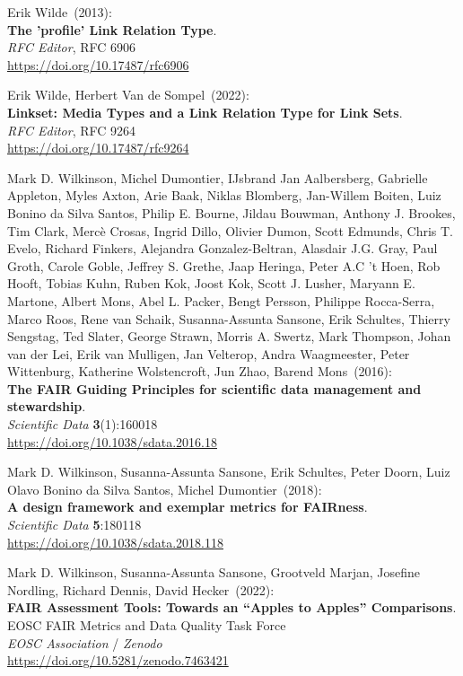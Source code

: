 \begin{thebibliography}{9}
Erik Wilde~(2013): \\
\textbf{The 'profile' Link Relation Type}.\\
\emph{RFC Editor}, RFC 6906\\
\url{https://doi.org/10.17487/rfc6906}

Erik Wilde, Herbert Van de Sompel~(2022): \\
\textbf{Linkset: Media Types and a Link Relation Type for Link Sets}.\\
\emph{RFC Editor}, RFC 9264\\
\url{https://doi.org/10.17487/rfc9264}

Mark D. Wilkinson, Michel Dumontier, IJsbrand Jan Aalbersberg, Gabrielle Appleton, Myles Axton, Arie Baak, Niklas Blomberg, Jan-Willem Boiten, Luiz Bonino da Silva Santos, Philip E. Bourne, Jildau Bouwman, Anthony J. Brookes, Tim Clark, Mercè Crosas, Ingrid Dillo, Olivier Dumon, Scott Edmunds, Chris T. Evelo, Richard Finkers, Alejandra Gonzalez-Beltran, Alasdair J.G. Gray, Paul Groth, Carole Goble, Jeffrey S. Grethe, Jaap Heringa, Peter A.C 't Hoen, Rob Hooft, Tobias Kuhn, Ruben Kok, Joost Kok, Scott J. Lusher, Maryann E. Martone, Albert Mons, Abel L. Packer, Bengt Persson, Philippe Rocca-Serra, Marco Roos, Rene van Schaik, Susanna-Assunta Sansone, Erik Schultes, Thierry Sengstag, Ted Slater, George Strawn, Morris A. Swertz, Mark Thompson, Johan van der Lei, Erik van Mulligen, Jan Velterop, Andra Waagmeester, Peter Wittenburg, Katherine Wolstencroft, Jun Zhao, Barend Mons~(2016): \\
\textbf{The FAIR Guiding Principles for scientific data management and stewardship}.\\
\emph{Scientific Data} \textbf{3}(1):160018\\
\url{https://doi.org/10.1038/sdata.2016.18}

Mark D. Wilkinson, Susanna-Assunta Sansone, Erik Schultes, Peter Doorn, Luiz Olavo Bonino da Silva Santos, Michel Dumontier~(2018): \\
\textbf{A design framework and exemplar metrics for FAIRness}.\\
\emph{Scientific Data} \textbf{5}:180118 \\
\url{https://doi.org/10.1038/sdata.2018.118}

Mark D. Wilkinson, Susanna-Assunta Sansone, Grootveld Marjan, Josefine Nordling, Richard Dennis, David Hecker~(2022): \\
\textbf{FAIR Assessment Tools: Towards an “Apples to Apples” Comparisons}.\\ 
EOSC FAIR Metrics and Data Quality Task Force\\
\emph{EOSC Association} / \emph{Zenodo}\\
\url{https://doi.org/10.5281/zenodo.7463421}


\end{thebibliography}
